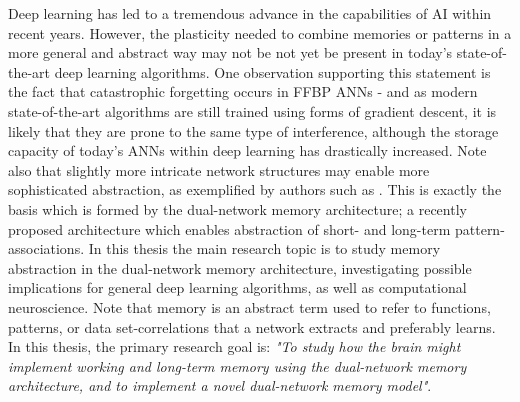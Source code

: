 Deep learning has led to a tremendous advance in the capabilities of AI within recent years. However, the plasticity needed to combine memories or patterns in a more general and abstract way may not be not yet be present in today's state-of-the-art deep learning algorithms. One observation supporting this statement is the fact that catastrophic forgetting occurs in FFBP ANNs - and as modern state-of-the-art algorithms are still trained using forms of gradient descent, it is likely that they are prone to the same type of interference, although the storage capacity of today's ANNs within deep learning has drastically increased. 
Note also that slightly more intricate network structures may enable more sophisticated abstraction, as exemplified by authors such as \cite{Tani2014}. This is exactly the basis which is formed by the dual-network memory architecture; a recently proposed architecture which enables abstraction of short- and long-term pattern-associations.
In this thesis the main research topic is to study memory abstraction in the dual-network memory architecture, investigating possible implications for general deep learning algorithms, as well as computational neuroscience. Note that memory is an abstract term used to refer to functions, patterns, or data set-correlations that a network extracts and preferably learns. 
\\
In this thesis, 
the primary research goal is: \textit{"To study how the brain might implement working and long-term memory using the dual-network memory architecture, and to implement a novel dual-network memory model"}.

